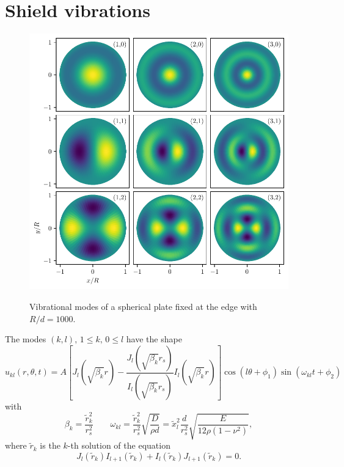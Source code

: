 \section{Shield vibrations}


\begin{figure}[!htbp]
  \centering
  \includegraphics[width=\textwidth]{./../figures/vibrations/vibrational-modes.pdf}
  \label{fig:5:vibrational-modes}
  \caption{Vibrational modes of a spherical plate fixed at the edge with $R/d = 1000$.}
\end{figure}


The modes $(k,l),\, 1 \leq k, \, 0 \leq l$ have the shape
\begin{equation}
  u_{kl}(r, \theta, t) = A\left[J_l(\sqrt{\beta_k}r) - \frac{J_l(\sqrt{\beta_k}r_s)}{I_l(\sqrt{\beta_k}r_s)}I_l(\sqrt{\beta_k}r)\right]\cos(l\theta+\phi_1)\sin(\omega_{kl}t+\phi_2)
\end{equation}
with
\begin{equation}
  \beta_k = \frac{\tilde{r}_k^2}{r_s^2} \quad \quad \omega_{kl} = \frac{\tilde{r}_k^2}{r_s^2}\sqrt{\frac{D}{\rho d}} = \tilde{x}_l^2\frac{d}{r_s^2}\sqrt{\frac{E}{12\rho(1-\nu^2)}} ,
\end{equation}
where $\tilde{r}_k$ is the $k$-th solution of the equation
\begin{equation}
  J_l(\tilde{r}_k)I_{l+1}(\tilde{r}_k)+I_l(\tilde{r}_k)J_{l+1}(\tilde{r}_k) = 0 .
\end{equation}


